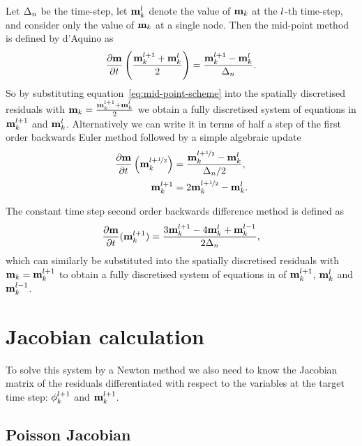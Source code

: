 Let $\Delta_{n}$ be the time-step, let $\mathbf{m}_k^l$ denote the value of $\mathbf{m}_k$ at the $l$-th time-step, and consider only the value of $\mathbf{m}_k$ at a single node. Then the mid-point method is defined by d'Aquino\cite{DAquino2005} as
\begin{equation}
  \label{eq:mid-point-scheme}
  \frac{\partial \mathbf{m}}{\partial t} \left( \frac{\mathbf{m}_k^{l+1} + \mathbf{m}_k^l}{2} \right) = \frac{\mathbf{m}_k^{l+1} - \mathbf{m}_k^l}{ \Delta_{n}}.
\end{equation}
So by substituting equation~\eqref{eq:mid-point-scheme} into the spatially discretised residuals with $\mathbf{m}_k = \frac{\mathbf{m}_k^{l+1} + \mathbf{m}^l_k}{2}$ we obtain a fully discretised system of equations in  $\mathbf{m}_k^{l+1}$ and $\mathbf{m}_k^l$.
Alternatively we can write it in terms of half a step of the first order backwards Euler method followed by a simple algebraic update \cite{Malidi2005}
\begin{equation}
  \label{eq:imr-bdf1}
  \begin{aligned}
    \frac{\partial \mathbf{m}}{\partial t} \left(\mathbf{m}_k^{l+\nicefrac{1}{2}} \right) &= \frac{\mathbf{m}_k^{l+\nicefrac{1}{2}} - \mathbf{m}_k^{l}}{\Delta_{n}/2}, \\
    \mathbf{m}_k^{l+1} &= 2\mathbf{m}_k^{l+\nicefrac{1}{2}} - \mathbf{m}_k^l.
  \end{aligned}
\end{equation}


The constant time step second order backwards difference method is defined as\cite{Atkinson2009}
\begin{equation}
  \label{eq:bdf2-scheme}
  \frac{\partial \mathbf{m}}{\partial t}(\mathbf{m}_k^{l+1}) = \frac{3 \mathbf{m}_k^{l+1} - 4 \mathbf{m}_k^{l} + \mathbf{m}_k^{l-1}}{2\Delta_{n}},
\end{equation}
which can similarly be substituted into the spatially discretised residuals with $\mathbf{m}_k = \mathbf{m}_k^{l+1}$ to obtain a fully discretised system of equations in of $\mathbf{m}_k^{l+1}$, $\mathbf{m}_k^l$ and $\mathbf{m}_k^{l-1}$.


\section{Jacobian calculation}
\label{sec:llg-jacobian-calculation}

To solve this system by a Newton method we also need to know the Jacobian matrix of the residuals differentiated with respect to the variables at the target time step: $\phi_{k}^{l+1}$ and $\mathbf{m}_{k}^{l+1}$.

\subsection{Poisson Jacobian}
\label{sec:poisson-jacobian}

